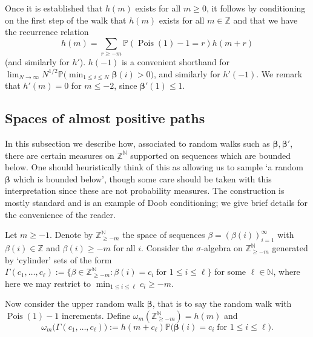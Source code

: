 \documentclass[11pt,reqno]{amsart}
\numberwithin{equation}{section}
\theoremstyle{definition}
\theoremstyle{remark}
\newcommand{\mb}{\mathbb}
\newcommand\Pois{\operatorname{Pois}}
\def\boldbeta{\boldsymbol\beta}
\renewcommand{\le}{\leqslant}
\renewcommand{\ge}{\geqslant}
\newcommand\Z{\mathbb{Z}}
\newcommand\N{\mathbb{N}}
\begin{document}
Once it is established that $h(m)$ exists for all $m \ge 0$, it follows by conditioning on the first step of the walk that $h(m)$ exists for all $m \in \Z$ and that we have the recurrence relation
\begin{equation}\label{vbar-recur} h(m) = \sum_{r \ge -m} \mb{P}(\Pois(1) - 1 = r) h(m + r)\end{equation} (and similarly for $h'$). $h(-1)$ is a convenient shorthand for $\lim_{N \rightarrow \infty} N^{1/2} \mb{P} \big( \min_{1 \le i \le N} \boldbeta(i) > 0\big)$, and similarly for $h'(-1)$. We remark that $h'(m) = 0$ for $m \le -2$, since $\boldbeta'(1) \le 1$.    



\subsection{Spaces of almost positive paths}\label{sec7.1}
In this subsection we describe how, associated to random walks such as $\boldbeta,\boldbeta'$, there are certain measures on $\Z^\N$ supported on sequences which are bounded below. One should heuristically think of this as allowing us to sample `a random $\boldbeta$ which is bounded below', though some care should be taken with this interpretation since these are not probability measures. The construction is mostly standard and is an example of Doob conditioning; we give brief details for the convenience of the reader.

Let $m \ge -1$. Denote by $\Z^{\N}_{\ge - m}$ the space of sequences $\beta = (\beta(i))_{i=1}^{\infty}$ with $\beta(i) \in \Z$ and $\beta(i) \ge -m$ for all $i$.
Consider the $\sigma$-algebra on $\Z^\N_{\ge -m}$ generated by `cylinder' sets of the form $\Gamma(c_1,\dots, c_{\ell}) := \{ \beta \in \Z^\N_{\ge -m} : \beta(i) = c_i \; \mbox{for $1 \le i \le \ell$}\}$ for some $\ell \in \N$, where here we may restrict to $\min_{1 \le i \le \ell} c_i \ge -m$.

Now consider the upper random walk $\boldbeta$, that is to say the random walk with $\Pois(1) - 1$ increments. Define $\omega_m(\Z^{\N}_{\ge -m}) = h(m)$ and
\begin{equation}\label{omega-meas-def} \omega_m \big(\Gamma(c_1,\dots, c_{\ell})\big) := h(m + c_{\ell}) \mb{P}\big(\boldbeta(i) = c_i \; \mbox{for $1 \le i \le \ell$}\big).\end{equation}
\end{document}
